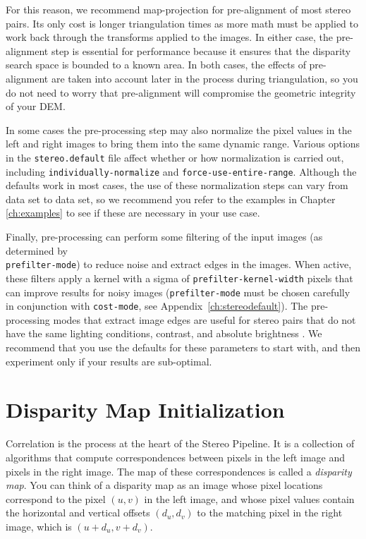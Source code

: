 For this reason, we recommend map-projection for pre-alignment of most
stereo pairs. Its only cost is longer triangulation times as more math
must be applied to work back through the transforms applied to the images. In
either case, the pre-alignment step is essential for performance
because it ensures that the disparity search space is bounded to a
known area.  In both cases, the effects of pre-alignment are taken
into account later in the process during triangulation, so you do not
need to worry that pre-alignment will compromise the geometric
integrity of your \ac{DEM}.

In some cases the pre-processing step may also normalize the pixel
values in the left and right images to bring them into the same
dynamic range.  Various options in the {\tt stereo.default} file
affect whether or how normalization is carried out, including
\texttt{individually-normalize} and
\texttt{force-use-entire-range}.  Although the defaults work in
most cases, the use of these normalization steps can vary from data
set to data set, so we recommend you refer to the examples in Chapter
\ref{ch:examples} to see if these are necessary in your use case.

Finally, pre-processing can perform some filtering of the input
images (as determined by \\ \texttt{prefilter-mode}) to reduce noise
and extract edges in the images.  When active, these filters apply
a kernel with a sigma of \texttt{prefilter-kernel-width} pixels
that can improve results for noisy images (\texttt{prefilter-mode}
must be chosen carefully in conjunction with \texttt{cost-mode},
see Appendix~\ref{ch:stereodefault}).  The pre-processing modes
that extract image edges are useful for stereo pairs that do not
have the same lighting conditions, contrast, and absolute brightness
\citep{Nishihara84practical}.  We recommend that you use the defaults
for these parameters to start with, and then experiment only if
your results are sub-optimal.

\section{Disparity Map Initialization}
\label{d-sub}

Correlation is the process at the heart of the Stereo Pipeline.  It is
a collection of algorithms that compute correspondences between pixels
in the left image and pixels in the right image.  The map of these
correspondences is called a {\em disparity map}.  You can think of a
disparity map as an image whose pixel locations correspond to
the pixel $(u,v)$ in the left image, and whose pixel values
contain the horizontal and vertical offsets $(d_u, d_v)$ to the
matching pixel in the right image, which is $(u+d_u, v+d_v)$.


